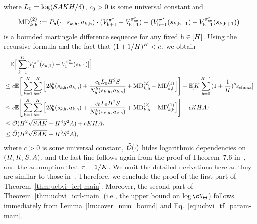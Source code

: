 where $L_0=\log({S}{A}{K}{H}/\delta)$,  $c_0>0$ is some universal constant and
\begin{align*}
 {\mathrm{MD}}^{(2)}_{k,{\mathsf{h}}}:={P}_{\mathsf{h}}(\cdot\mid{s}_{k,{\mathsf{h}}},{a}_{k,{\mathsf{h}}})\cdot({{V}}_{{\mathsf{h}}+1}^{\pi^*}-{{V}}_{{\mathsf{h}}+1}^{{\pi}^k_{\mathsf{sm}}})-  ({{V}}_{{\mathsf{h}}+1}^{\pi^*}({s}_{k,{\mathsf{h}}+  1})-{{V}}_{{\mathsf{h}}+1}^{{\pi}^k_{\mathsf{sm}}}({s}_{k,{\mathsf{h}}+  1}))
\end{align*} is a bounded martingale difference sequence for any fixed ${\mathsf{h}}\in[{H}]$. Using the recursive formula and the fact that $(1+1/{H})^{H}<e$, we obtain
\begin{align*}
 &\quad \mathbb{E}\Big[ \sum_{k=1}^{K} [{{V}}_1^{{\pi^*}}({s}_{k,1})-{{V}}_1^{{\pi}^k_{{\mathsf{sm}}}}({s}_{k,1})
 ]  \Big]\\
 &\leq c\mathbb{E}\Bigg[\sum_{k=1}^{K}\sum_{{\mathsf{h}}=1}^{H}\Big[2{b}_{\mathsf{h}}^k({s}_{k,{\mathsf{h}}},{a}_{k,{\mathsf{h}}})
+
\frac{c_0L_0{H}^2{S}}{{N}^k_{\mathsf{h}}({s}_{k,{\mathsf{h}}},{a}_{k,{\mathsf{h}}})}+{\mathrm{MD}}^{(2)}_{k,{\mathsf{h}}}+{\mathrm{MD}}^{(1)}_{k,{\mathsf{h}}}\Big]\Bigg]+\mathbb{E}[{K}\sum_{{\mathsf{h}}=0}^{{H}-1}(1+\frac{1}{{H}})^{\mathsf{h}}{\varepsilon_{\mathrm{sfmax}}}]\\
&\leq c\mathbb{E}\Bigg[\sum_{k=1}^{K}\sum_{{\mathsf{h}}=1}^{H}\Big[2{b}_{\mathsf{h}}^k({s}_{k,{\mathsf{h}}},{a}_{k,{\mathsf{h}}})
+
\frac{c_0L_0{H}^2{S}}{{N}^k_{\mathsf{h}}({s}_{k,{\mathsf{h}}},{a}_{k,{\mathsf{h}}})}+{\mathrm{MD}}^{(2)}_{k,{\mathsf{h}}}+{\mathrm{MD}}^{(1)}_{k,{\mathsf{h}}}\Big]\Bigg]+c{K}{H}{A}{\tau}\\
&\leq
{\tilde{\mathcal O}} ({H}^2\sqrt{{S}{A}{K}}+{H}^3{S}^2{A})+c{K}{H}{A}{\tau}\\
&\leq {\tilde{\mathcal O}}({H}^2\sqrt{{S}{A}{K}}+{H}^3{S}^2{A}),
\end{align*} where $c>0$ is some universal constant,  ${\tilde{\mathcal O}}(\cdot)$ hides logarithmic dependencies on $({H},{K},{S},{A})$, and the last line follows again from the proof of Theorem~7.6 in~\cite{agarwal2019reinforcement}, and the assumption that ${\tau}=1/{K}$.
 We omit the detailed derivations here as they are similar to those in~\cite{azar2017minimax,agarwal2019reinforcement}. Therefore, we conclude the proof of the first part of Theorem~\ref{thm:ucbvi_icrl-main}. Moreover,  the second part of Theorem~\ref{thm:ucbvi_icrl-main} (i.e., the upper bound on $\log\cN_{\tfparspace}$) follows immediately from Lemma~\ref{lm:cover_num_bound} and Eq.~\eqref{eq:ucbvi_tf_param-main}.


